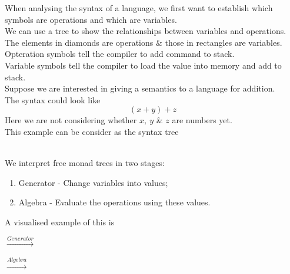 \documentclass[11pt,a4paper]{article}
\begin{document}
When analysing the syntax of a language, we first want to establish which symbols are operations and which are variables.\\
We can use a tree to show the relationships between variables and operations.\\
The elements in diamonds are operations \& those in rectangles are variables.\\

Opteration symbols tell the compiler to add command to stack.\\
Variable symbols tell the compiler to load the value into memory and add to stack.\\

Suppose we are interested in giving a semantics to a language for addition.\\
The syntax could look like
$$(x+y)+z$$
Here we are not considering whether $x,\ y$ \& $z$ are numbers yet.\\
This example can be consider as the syntax tree\\
\\

We interpret free monad trees in two stages:
\begin{enumerate}[label=\roman*)]
  \item Generator - Change variables into values;
  \item Algebra - Evaluate the operations using these values.
\end{enumerate}
A visualised example of this is\\
$\xrightarrow{Generator}$
$\xrightarrow{Algebra}$
\\
\end{document}
